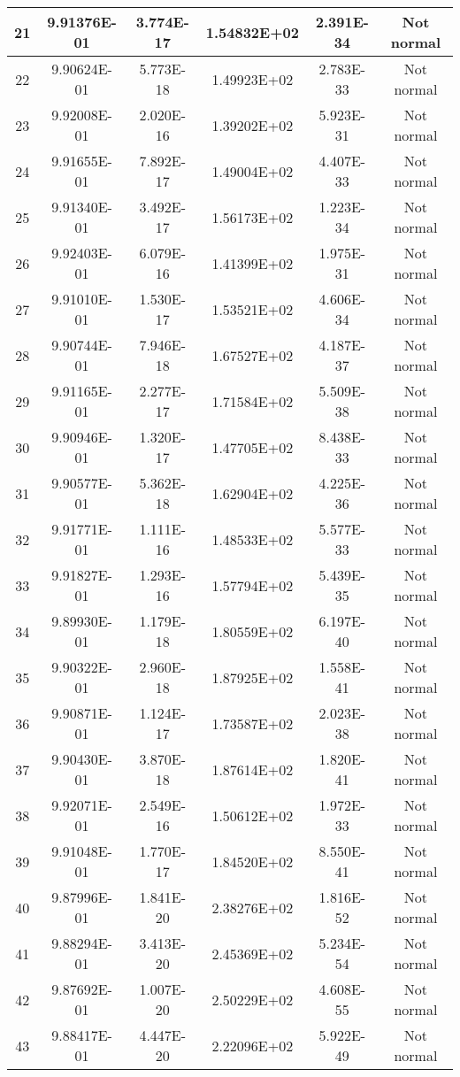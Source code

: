 \begin{table}[h]
\begin{tabular}{|c|c|c|c|c|c|}
		21 & 9.91376E-01 & 3.774E-17 & 1.54832E+02 & 2.391E-34 & Not normal\\\hline
		22 & 9.90624E-01 & 5.773E-18 & 1.49923E+02 & 2.783E-33 & Not normal\\\hline
		23 & 9.92008E-01 & 2.020E-16 & 1.39202E+02 & 5.923E-31 & Not normal\\\hline
		24 & 9.91655E-01 & 7.892E-17 & 1.49004E+02 & 4.407E-33 & Not normal\\\hline
		25 & 9.91340E-01 & 3.492E-17 & 1.56173E+02 & 1.223E-34 & Not normal\\\hline
		26 & 9.92403E-01 & 6.079E-16 & 1.41399E+02 & 1.975E-31 & Not normal\\\hline
		27 & 9.91010E-01 & 1.530E-17 & 1.53521E+02 & 4.606E-34 & Not normal\\\hline
		28 & 9.90744E-01 & 7.946E-18 & 1.67527E+02 & 4.187E-37 & Not normal\\\hline
		29 & 9.91165E-01 & 2.277E-17 & 1.71584E+02 & 5.509E-38 & Not normal\\\hline
		30 & 9.90946E-01 & 1.320E-17 & 1.47705E+02 & 8.438E-33 & Not normal\\\hline
		31 & 9.90577E-01 & 5.362E-18 & 1.62904E+02 & 4.225E-36 & Not normal\\\hline
		32 & 9.91771E-01 & 1.111E-16 & 1.48533E+02 & 5.577E-33 & Not normal\\\hline
		33 & 9.91827E-01 & 1.293E-16 & 1.57794E+02 & 5.439E-35 & Not normal\\\hline
		34 & 9.89930E-01 & 1.179E-18 & 1.80559E+02 & 6.197E-40 & Not normal\\\hline
		35 & 9.90322E-01 & 2.960E-18 & 1.87925E+02 & 1.558E-41 & Not normal\\\hline
		36 & 9.90871E-01 & 1.124E-17 & 1.73587E+02 & 2.023E-38 & Not normal\\\hline
		37 & 9.90430E-01 & 3.870E-18 & 1.87614E+02 & 1.820E-41 & Not normal\\\hline
		38 & 9.92071E-01 & 2.549E-16 & 1.50612E+02 & 1.972E-33 & Not normal\\\hline
		39 & 9.91048E-01 & 1.770E-17 & 1.84520E+02 & 8.550E-41 & Not normal\\\hline
		40 & 9.87996E-01 & 1.841E-20 & 2.38276E+02 & 1.816E-52 & Not normal\\\hline
		41 & 9.88294E-01 & 3.413E-20 & 2.45369E+02 & 5.234E-54 & Not normal\\\hline
		42 & 9.87692E-01 & 1.007E-20 & 2.50229E+02 & 4.608E-55 & Not normal\\\hline
		43 & 9.88417E-01 & 4.447E-20 & 2.22096E+02 & 5.922E-49 & Not normal\\\hline

\end{tabular}
\end{table}
